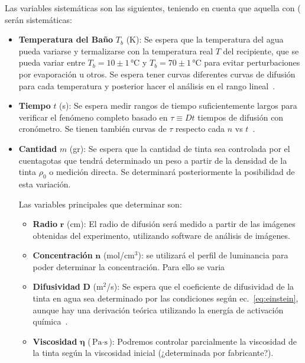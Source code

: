 \documentclass[11pt]{article}
\begin{document}
Las variables sistemáticas   son las siguientes, teniendo en cuenta que aquella con ( serán sistemáticas:
\begin{itemize}
    \item \textbf{Temperatura del Baño} $T_b$ (K): Se espera que la temperatura del agua pueda variarse y termalizarse con la temperatura real $T$ del recipiente, que se pueda variar entre $T_b = 10 \pm 1 \, \unit{\degreeCelsius}$ y $T_b = 70 \pm 1 \, \unit{\degreeCelsius}$ para evitar perturbaciones por evaporación u otros. Se espera tener curvas diferentes curvas de difusión para cada temperatura y posterior hacer el análisis en el rango lineal~\cite{leeInkDifussionWater2004}.
    \item \textbf{Tiempo} $t$ (s): Se espera medir rangos de tiempo suficientemente largos para verificar el fenómeno completo basado en $\tau\equiv Dt$ tiempos de difusión con cronómetro. Se tienen también curvas de $\tau$ respecto cada $n$ vs $t$~\cite{leeInkDifussionWater2004}.
    \item \textbf{Cantidad} $m$ (gr): Se espera que la cantidad de tinta sea controlada por el cuentagotas que tendrá determinado un peso a partir de la densidad de la tinta $\rho_0$ o medición directa. Se determinará posteriormente la posibilidad de esta variación.

Las variables principales que determinar son:
\begin{itemize}
    \item \textbf{Radio} $\mathbf{r}$ (cm): El radio de difusión será medido a partir de las imágenes obtenidas del experimento, utilizando software de análisis de imágenes.
    \item \textbf{Concentración} $\mathbf{n}$ (mol/cm$^3$): se utilizará el perfil de luminancia para poder determinar la concentración. Para ello se varia 
    \item \textbf{Difusividad} $\mathbf{D}$ (m$^2$/s): Se espera que el coeficiente de difusividad de la tinta en agua sea determinado por las condiciones según ec.~\ref{eq:einstein}, aunque hay una derivación teórica utilizando la energía de activación química~\cite{leeInkDifussionWater2004}.
    \item \textbf{Viscosidad} $\mathbf{\eta}$ ($\unit{\pascal} \cdot \unit{\second}$): Podremos controlar parcialmente la viscosidad de la tinta según la viscosidad inicial (¿determinada por fabricante?).
\end{itemize}

\end{itemize}
\end{document}

